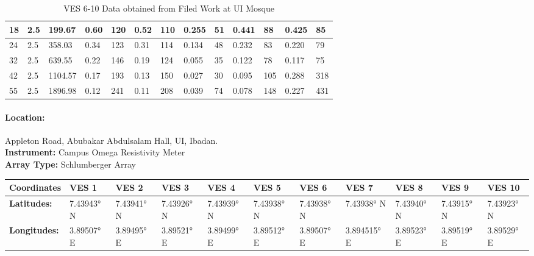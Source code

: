 \documentclass[12pt,a4paper]{report}
\begin{document}
\begin{itemize}
\begin{table}[H]
\begin{adjustbox}{max width=\textwidth}
\begin{tabular}{|p{2.5cm}|p{2.5cm}|p{2.5cm}|p{1.5cm}|p{1.8cm}|p{1.5cm}|p{1.8cm}|p{1.5cm}|p{1.8cm}|p{1.5cm}|p{1.8cm}|p{1.5cm}|p{1.8cm}|}
        18 & 2.5 & 199.67 & 0.60 & 120 & 0.52 & 110 & 0.255 & 51 & 0.441 & 88 & 0.425 & 85 \\ \hline
        24 & 2.5 & 358.03 & 0.34 & 123 & 0.31 & 114 & 0.134 & 48 & 0.232 & 83 & 0.220 & 79 \\ \hline
        32 & 2.5 & 639.55 & 0.22 & 146 & 0.19 & 124 & 0.055 & 35 & 0.122 & 78 & 0.117 & 75 \\ \hline
        42 & 2.5 & 1104.57 & 0.17 & 193 & 0.13 & 150 & 0.027 & 30 & 0.095 & 105 & 0.288 & 318 \\ \hline
        55 & 2.5 & 1896.98 & 0.12 & 241 & 0.11 & 208 & 0.039 & 74 & 0.078 & 148 & 0.227 & 431 \\ \hline
        \end{tabular}
        \end{adjustbox}
        \caption{VES 6-10 Data obtained from Filed Work at UI Mosque}
        \label{tab:ui_ves-6-10}
    \end{table}

    \paragraph{\textbf{Location:}} {Appleton Road, Abubakar Abdulsalam Hall, UI, Ibadan.} \\
    \textbf{Instrument:} {Campus Omega Resistivity Meter} \\
    \textbf{Array Type:} {Schlumberger Array }

    \begin{table}[H]
        \centering
        \begin{adjustbox}{max width=\textwidth}
        \renewcommand{\arraystretch}{1.5}
        \begin{tabular}{|p{2.5cm}|p{1.5cm}|p{1.8cm}|p{1.5cm}|p{1.8cm}|p{1.5cm}|p{1.8cm}|p{1.5cm}|p{1.8cm}|p{1.5cm}|p{1.8cm}|}
        \hline
        \textbf{Coordinates} &  
        \textbf{VES 1} & 
        \textbf{VES 2} & 
        \textbf{VES 3} & 
        \textbf{VES 4} & 
        \textbf{VES 5} & 
        \textbf{VES 6} & 
        \textbf{VES 7} & 
        \textbf{VES 8} & 
        \textbf{VES 9} & 
        \textbf{VES 10} \\ 
        \hline
        \textbf{Latitudes:} & 7.43943° N & 7.43941° N & 7.43926° N & 7.43939° N & 7.43938° N & 7.43938° N & 7.43938° N & 7.43940° N & 7.43915° N & 7.43923° N \\ \hline
        \textbf{Longitudes:} & 3.89507° E & 3.89495° E & 3.89521° E & 3.89499° E & 3.89512° E & 3.89507° E & 3.894515° E & 3.89523° E & 3.89519° E & 3.89529° E \\ \hline
        \end{tabular}
        \end{adjustbox}
        \label{tab:AAH VES Coordinates: 1-10}
    \end{table}


\end{itemize}
\end{document}
